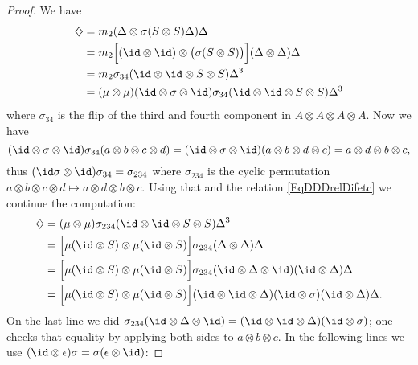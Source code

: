 \begin{proof}
	We have
	\begin{equation}
		\begin{aligned}[]
			\diamondsuit & =m_2(\Delta\otimes\sigma(S\otimes S)\Delta)\Delta                                                \\
			             & =m_2\Big[ (\id\otimes\id)\otimes\big( \sigma(S\otimes S) \big) \Big](\Delta\otimes \Delta)\Delta \\
			             & =m_2\sigma_{34}(\id\otimes\id\otimes S\otimes S)\Delta^3                                         \\
			             & =(\mu\otimes\mu)(\id\otimes\sigma\otimes\id)\sigma_{34}(\id\otimes\id\otimes S\otimes S)\Delta^3
		\end{aligned}
	\end{equation}
	where \( \sigma_{34}\) is the flip of the third and fourth component in \( A\otimes A\otimes A\otimes A\). Now we have
	\begin{equation}
		(\id\otimes\sigma\otimes \id)\sigma_{34}(a\otimes b\otimes c\otimes d)=(\id\otimes\sigma\otimes\id)(a\otimes b\otimes d\otimes c)=a\otimes d\otimes b\otimes c,
	\end{equation}
	thus \( (\id\sigma\otimes \id)\sigma_{34}=\sigma_{234}\) where \( \sigma_{234}\) is the cyclic permutation \( a\otimes b\otimes c\otimes d\mapsto a\otimes d\otimes b\otimes c\). Using that and the relation \eqref{EqDDDrelDifetc} we continue the computation:
	\begin{subequations}
		\begin{align}
			\diamondsuit & =(\mu\otimes\mu)\sigma_{234}(\id\otimes\id\otimes S\otimes S)\Delta^3                                                            \\
			             & =\Big[ \mu(\id\otimes S)\otimes\mu(\id\otimes S) \Big]\sigma_{234}(\Delta\otimes \Delta)\Delta                                   \\
			             & =\Big[ \mu(\id\otimes S)\otimes\mu(\id\otimes S) \Big]\sigma_{234}(\id\otimes\Delta\otimes\id)(\id\otimes\Delta)\Delta           \\
			             & =\Big[ \mu(\id\otimes S)\otimes\mu(\id\otimes S) \Big](\id\otimes\id\otimes\Delta)(\id\otimes\sigma)   (\id\otimes\Delta)\Delta.
		\end{align}
	\end{subequations}
	On the last line we did \( \sigma_{234}(\id\otimes\Delta\otimes\id)=(\id\otimes\id\otimes\Delta)(\id\otimes\sigma)\); one checks that equality by applying both sides to \( a\otimes b\otimes c\). In the following lines we use \( (\id\otimes\epsilon)\sigma=\sigma(\epsilon\otimes\id)\):

\end{proof}
